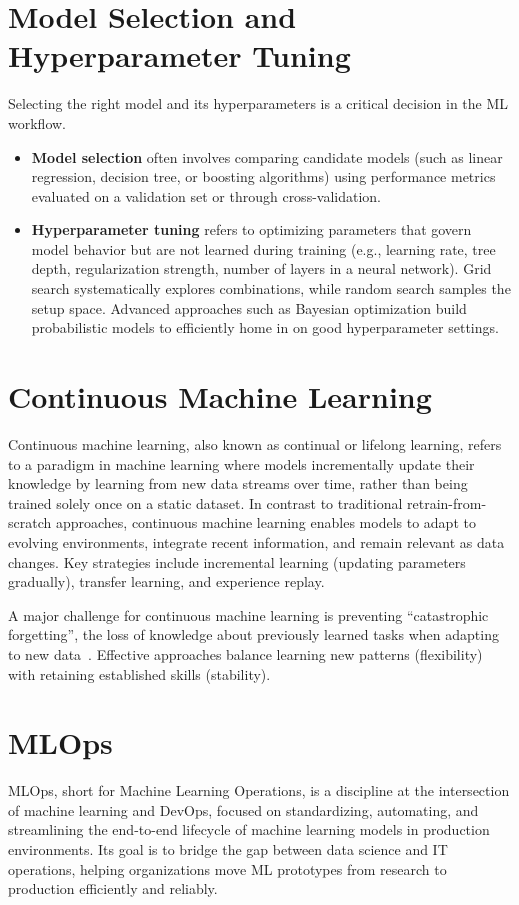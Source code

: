 \section{Model Selection and Hyperparameter Tuning}

Selecting the right model and its hyperparameters is a critical decision in the ML workflow.

\begin{itemize}
    \item \textbf{Model selection} often involves comparing candidate models (such as linear regression, decision tree, or boosting algorithms) using performance metrics evaluated on a validation set or through cross-validation.
    \item \textbf{Hyperparameter tuning} refers to optimizing parameters that govern model behavior but are not learned during training (e.g., learning rate, tree depth, regularization strength, number of layers in a neural network).
        Grid search systematically explores combinations, while random search samples the setup space.
        Advanced approaches such as Bayesian optimization build probabilistic models to efficiently home in on good hyperparameter settings.
\end{itemize}

\section{Continuous Machine Learning}
Continuous machine learning, also known as continual or lifelong learning, refers to a paradigm in machine learning where models incrementally update their knowledge by learning from new data streams over time, rather than being trained solely once on a static dataset.
In contrast to traditional retrain-from-scratch approaches, continuous machine learning enables models to adapt to evolving environments, integrate recent information, and remain relevant as data changes.
Key strategies include incremental learning (updating parameters gradually), transfer learning, and experience replay.

A major challenge for continuous machine learning is preventing ``catastrophic forgetting'', the loss of knowledge about previously learned tasks when adapting to new data~\cite{parisi2019continual}.
Effective approaches balance learning new patterns (flexibility) with retaining established skills (stability).

\section{MLOps}
MLOps, short for Machine Learning Operations, is a discipline at the intersection of machine learning and DevOps, focused on standardizing, automating, and streamlining the end-to-end lifecycle of machine learning models in production environments.
Its goal is to bridge the gap between data science and IT operations, helping organizations move ML prototypes from research to production efficiently and reliably.

